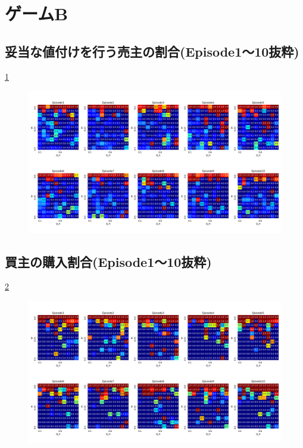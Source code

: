 \documentclass[a4paper,fontsize=11pt,report,notitlepage,line_length=38zw,number_of_lines=40,dvipdfmx]{jlreq}
\begin{document}
\section{ゲームB}
\begin{landscape}
\subsection{妥当な値付けを行う売主の割合(Episode1〜10抜粋)}
\ref{Honest_Seller_gameB}
\begin{figure}
 \centering
 \includegraphics[width=18cm]{Honest_Seller_gameB.png}
 \caption{}
 \label{Honest_Seller_gameB}
\end{figure}
\end{landscape}
\newpage
\begin{landscape}
\subsection{買主の購入割合(Episode1〜10抜粋)}
\ref{Trading_gameB}
\begin{figure}
 \centering
 \includegraphics[width=18cm]{Trading_gameB.png}
 \caption{}
 \label{Trading_gameB}
\end{figure}
\end{landscape}
\end{document}
